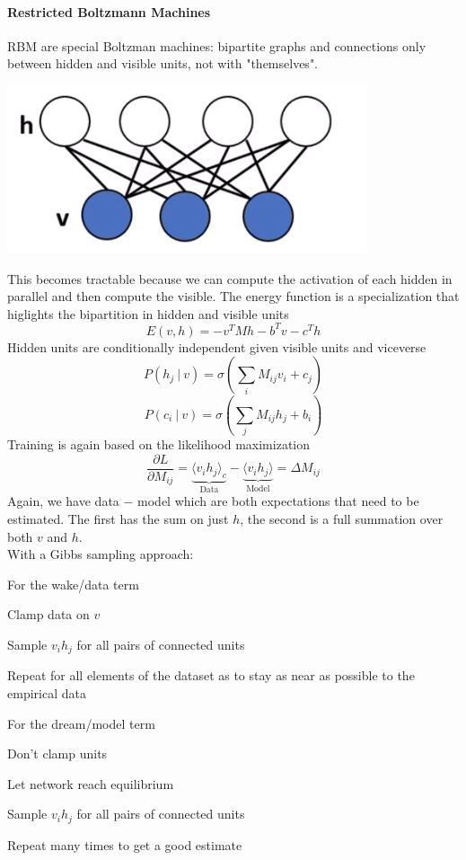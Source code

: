\documentclass[10pt]{report}
\begin{document}
\paragraph{Restricted Boltzmann Machines} RBM are special Boltzman machines: bipartite graphs and connections only between hidden and visible units, not with "themselves".
\begin{center}
	\includegraphics[scale=0.5]{47.png}
\end{center}
This becomes tractable because we can compute the activation of each hidden in parallel and then compute the visible. The energy function is a specialization that higlights the bipartition in hidden and visible units $$E(v,h) = -v^TMh - b^Tv - c^Th$$
Hidden units are conditionally independent given visible units and viceverse
$$P(h_j\:|\:v)=\sigma\left(\sum_i M_{ij}v_i+c_j\right)$$
$$P(c_i\:|\:v)=\sigma\left(\sum_j M_{ij}h_j+b_i\right)$$
Training is again based on the likelihood maximization $$\frac{\partial L}{\partial M_{ij}} = \underset{\text{Data}}{\underbrace{\langle v_ih_j\rangle_c}} - \underset{\text{Model}}{\underbrace{\langle v_ih_j\rangle}} = \Delta M_{ij}$$
Again, we have data $-$ model which are both expectations that need to be estimated. The first has the sum on just $h$, the second is a full summation over both $v$ and $h$.\\
With a Gibbs sampling approach:
\begin{multicols}{2}
For the wake/data term\begin{list}{}{}
	\item Clamp data on $v$
	\item Sample $v_ih_j$ for all pairs of connected units
	\item Repeat for all elements of the dataset as to stay as near as possible to the empirical data
\end{list}
\columnbreak

For the dream/model term\begin{list}{}{}
	\item Don't clamp units
	\item Let network reach equilibrium
	\item Sample $v_ih_j$ for all pairs of connected units
	\item Repeat many times to get a good estimate
\end{list}
\end{multicols}
\end{document}
